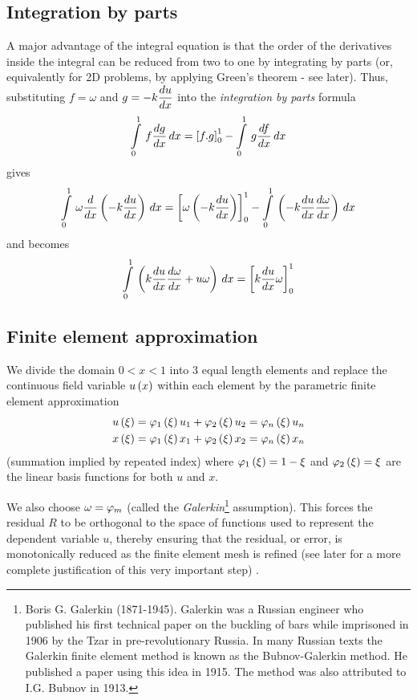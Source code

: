 \subsection{Integration by parts}

A major advantage of the integral equation is that the order of the
derivatives inside the integral can be reduced from two to one by integrating
by parts (or, equivalently for 2D problems, by applying Green's theorem - see
later).  Thus, substituting $f=\omega$ and $g=-k \dfrac{ d u}{d x} $ into the
\emph{integration by parts} formula
\begin{equation*}
    \displaystyle\int\limits_{0}^{1} \,f \dfrac{ d g}{d x} \,dx  =  \displaystyle\left[ f.g \right]_{0}^{1} -   \displaystyle\int\limits_{0}^{1} \,g \dfrac{ d f}{d x} \,dx 
\end{equation*}
gives
\begin{equation*}
    \displaystyle\int\limits_{0}^{1} \,\omega \dfrac{ d  }{d x} \left( -k \dfrac{ d u}{d x}  \right)\,dx  
  =  \displaystyle\left[ \omega\left( -k \dfrac{ d u}{d x}  \right) \right]_{0}^{1} -
    \displaystyle\int\limits_{0}^{1} \,\left( -k \dfrac{ d u}{d x}  \dfrac{ d \omega}{d x}  \right)\,dx 
\end{equation*}
and  becomes 
\begin{equation}
    \displaystyle\int\limits_{0}^{1} \,\left( k  \dfrac{ d u}{d x}  \dfrac{ d \omega}{d x} +u\omega \right)\,dx  =  \displaystyle\left[ k \dfrac{ d u}{d x} \omega \right]_{0}^{1} 
  \label{eqn:integration_by_parts}
\end{equation}

\subsection{Finite element approximation}

We divide the domain  $0<x<1$ into 3 equal length elements and replace the 
continuous field variable $ u\left( x \right) $ within each element by the parametric
finite element approximation
\begin{align*}
   u\left( \xi \right) &=   \varphi_{1} \left( \xi \right)  u_{1}+   \varphi_{2} \left( \xi \right)  u_{2}=   \varphi_{n} \left( \xi \right)  u_{n}\\
   x\left( \xi \right) &=   \varphi_{1} \left( \xi \right)  x_{1}+   \varphi_{2} \left( \xi \right)  x_{2}=   \varphi_{n} \left( \xi \right)  x_{n}
\end{align*}
(summation implied by repeated index)
where $   \varphi_{1} \left( \xi \right)  =1-\xi$ and $   \varphi_{2} \left( \xi \right)  =\xi$ are the linear basis 
functions for both $u$ and $x$. 

We also choose $\omega= \varphi_{m} $ (called the
\emph{Galerkin}\footnote{Boris G. Galerkin (1871-1945). 
    Galerkin was a Russian engineer who published his
    first technical paper on the buckling of bars while imprisoned in 1906 by
    the Tzar in pre-revolutionary Russia. In many Russian
    texts the Galerkin finite element method is known as the
    Bubnov-Galerkin method.
    He published a paper using this idea in 1915. The method was also attributed
    to I.G. Bubnov in 1913.}
assumption). This forces the
residual $R$ to be orthogonal to the space of functions used to represent the
dependent variable $u$, thereby ensuring that the residual, or error, is
monotonically reduced as the finite element mesh is refined (see later for a
more complete justification of this very important step)
.

